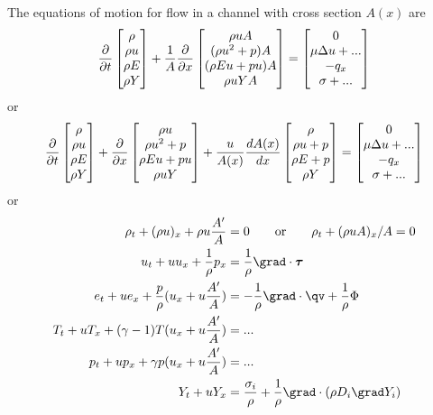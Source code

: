 \documentclass[10pt]{article}
\begin{document}
The equations of motion for flow in a channel with cross section $A(x)$ are
\begin{align}
{\partial \over \partial t} \begin{bmatrix} \rho \\ \rho u \\ \rho E \\ \rho Y \end{bmatrix}
+{1\over A} {\partial \over \partial x} 
\begin{bmatrix} \rho u A \\ (\rho u^2 + p)A  \\ (\rho E u + p u)A  \\ \rho u Y A \end{bmatrix}
= \begin{bmatrix} 0 \\ \mu \Delta u + ...  \\ -q_x  \\ \sigma + ... \end{bmatrix}
\end{align}
or 
\begin{align}
{\partial \over \partial t} \begin{bmatrix} \rho \\ \rho u \\ \rho E \\ \rho Y \end{bmatrix}
+{\partial \over \partial x} \begin{bmatrix} \rho u \\ \rho u^2 + p  \\ \rho E u + p u  \\ \rho u Y \end{bmatrix}
+{u\over A(x)} {d A(x) \over d x} \begin{bmatrix} \rho \\ \rho u  + p  \\ \rho E + p  \\ \rho  Y \end{bmatrix}
= \begin{bmatrix} 0 \\ \mu \Delta u + ...  \\ -q_x  \\ \sigma + ... \end{bmatrix}
\end{align}
or 
\begin{align}
   \rho_t + (\rho u)_x  + \rho u {A' \over A}&=0 \qquad\mbox{or}\qquad \rho_t+(\rho u A)_x/A =0\\
   u_t  + u u_x +{1\over\rho} p_x &= {1\over\rho}\grad\cdot\tauv \\
   e_t  + u e_x + {p\over\rho} ( u_x + u {A' \over A})
           &= -{1\over\rho} \grad\cdot\qv  + {1\over\rho}\Phi    \\
   T_t  + u T_x + (\gamma-1) T ( u_x + u {A' \over A})
           &= ...    \\
   p_t  + u p_x + \gamma p ( u_x + u {A' \over A})
           &= ...    \\
   Y_t + u Y_x &= {\sigma_i \over \rho} +{1\over\rho}\grad\cdot(\rho D_i\grad Y_i) 
\end{align}
\end{document}
